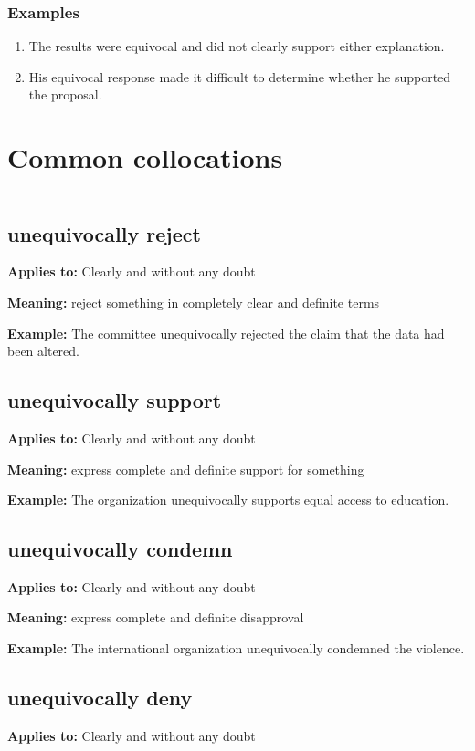 \documentclass[11pt]{article}
\newcommand{\sectionrule}{\par\vspace{-0.5em}\noindent\textcolor{Accent}{\rule{\linewidth}{0.6pt}}\par}
\begin{document}
\subsubsection{Examples}
\begin{enumerate}
  \item The results were equivocal and did not clearly support either explanation.
  \item His equivocal response made it difficult to determine whether he supported the proposal.
\end{enumerate}

\section{Common collocations}
\sectionrule
\subsection{unequivocally reject}
\textbf{Applies to:} Clearly and without any doubt

\textbf{Meaning:} reject something in completely clear and definite terms

\textbf{Example:} The committee unequivocally rejected the claim that the data had been altered.

\subsection{unequivocally support}
\textbf{Applies to:} Clearly and without any doubt

\textbf{Meaning:} express complete and definite support for something

\textbf{Example:} The organization unequivocally supports equal access to education.

\subsection{unequivocally condemn}
\textbf{Applies to:} Clearly and without any doubt

\textbf{Meaning:} express complete and definite disapproval

\textbf{Example:} The international organization unequivocally condemned the violence.

\subsection{unequivocally deny}
\textbf{Applies to:} Clearly and without any doubt
\end{document}
